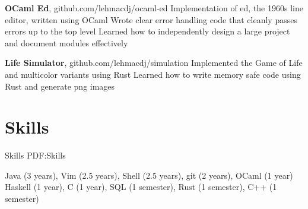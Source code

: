 \documentclass[letterpaper,10pt,oneside]{simpleresume}
\begin{document}
\begin{minipage}[t][0pt]{\linewidth}
\begin{body}
\textbf{OCaml Ed}, github.com/lehmacdj/ocaml-ed
\BulletItem%
Implementation of ed, the 1960s line editor, written using OCaml
\BulletItem%
Wrote clear error handling code that cleanly passes errors up to the top level
\BulletItem%
Learned how to independently design a large project and document modules
effectively
\GapNoBreak%


\textbf{Life Simulator}, github.com/lehmacdj/simulation
\BulletItem%
Implemented the Game of Life and multicolor variants using Rust
\BulletItem%
Learned how to write memory safe code using Rust and generate png images

\section%
{Skills}
{Skills}
{PDF:Skills}

\BulletItem%
Java (3 years), Vim (2.5 years), Shell (2.5 years), git (2 years),
OCaml (1 year)
\BulletItem%
Haskell (1 year), C (1 year), SQL (1 semester), Rust (1 semester),
C++ (1 semester)

\end{body}
\end{minipage}
\end{document}
